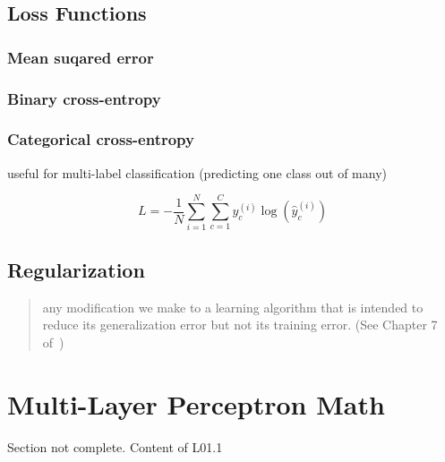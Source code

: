 \documentclass[11pt]{article}
\begin{document}

\subsection{Loss Functions}

\subsubsection{Mean suqared error}


\subsubsection{Binary cross-entropy}


\subsubsection{Categorical cross-entropy}

useful for multi-label classification (predicting one class out of many)

\begin{equation}
    L = - \frac 1 N \sum^N_{i=1}\sum^C_{c=1} y_c^{(i)}\log(\hat{y}_c^{(i)})
\end{equation}

\subsection{Regularization}

\begin{quote}
    any modification we make to a learning algorithm that is intended to reduce its generalization error but not its training error. (See Chapter 7 of~\cite{Goodfellow-et-al-2016})
\end{quote}

\section{Multi-Layer Perceptron Math}

\begin{warning}
    Section not complete. Content of L01.1
\end{warning}

\printbibliography
\end{document}
